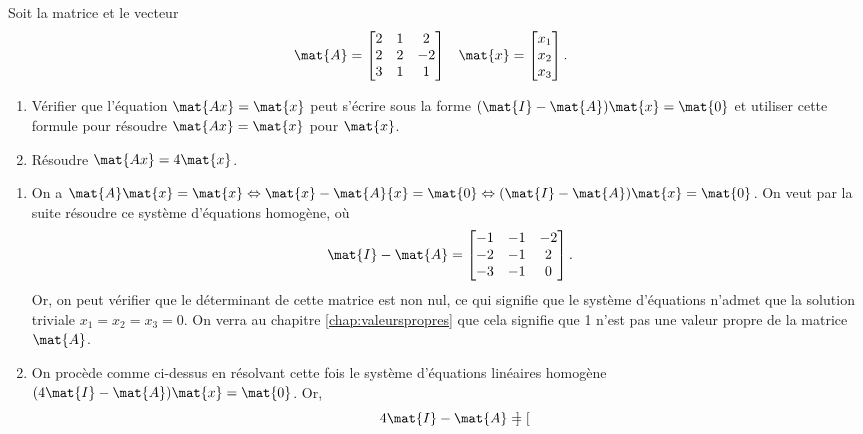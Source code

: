 \begin{exercice}
  Soit la matrice et le vecteur
  \begin{align*}
    \mat{A}
    &=
    \begin{bmatrix}
      2 & 1 & 2 \\ 2 & 2 & -2 \\ 3 & 1 & 1
    \end{bmatrix} &
    \mat{x}
    &=
    \begin{bmatrix}
      x_1 \\ x_2 \\ x_3
    \end{bmatrix}.
  \end{align*}
  \begin{enumerate}
  \item Vérifier que l'équation $\mat{Ax} = \mat{x}$ peut s'écrire
    sous la forme $(\mat{I} - \mat{A}) \mat{x} = \mat{0}$ et utiliser
    cette formule pour résoudre $\mat{Ax} = \mat{x}$ pour $\mat{x}$.
  \item Résoudre $\mat{Ax} = 4 \mat{x}$.
  \end{enumerate}
  \begin{sol}
    \begin{enumerate}
    \item On a $\mat{A}\mat{x} = \mat{x} \Leftrightarrow \mat{x} -
      \mat{A}{x} = \mat{0} \Leftrightarrow (\mat{I} - \mat{A}) \mat{x}
      = \mat{0}$. On veut par la suite résoudre ce système d'équations
      homogène, où
      \begin{displaymath}
        \mat{I} - \mat{A} =
        \begin{bmatrix}
          -1 & -1 & -2 \\ -2 & -1 & 2 \\ -3 & -1 & 0
        \end{bmatrix}.
      \end{displaymath}
      Or, on peut vérifier que le déterminant de cette matrice est non
      nul, ce qui signifie que le système d'équations n'admet que la
      solution triviale $x_1 = x_2 = x_3 = 0$. On verra au chapitre
      \ref{chap:valeurspropres} que cela signifie que 1 n'est pas une
      valeur propre de la matrice $\mat{A}$.
    \item On procède comme ci-dessus en résolvant cette fois le
      système d'équations linéaires homogène $(4\mat{I} - \mat{A})
      \mat{x} = \mat{0}$. Or,
      \begin{displaymath}
        4 \mat{I} - \mat{A} =
        \begin{bmatrix}

\end{bmatrix}
\end{displaymath}
\end{enumerate}
\end{sol}
\end{exercice}
